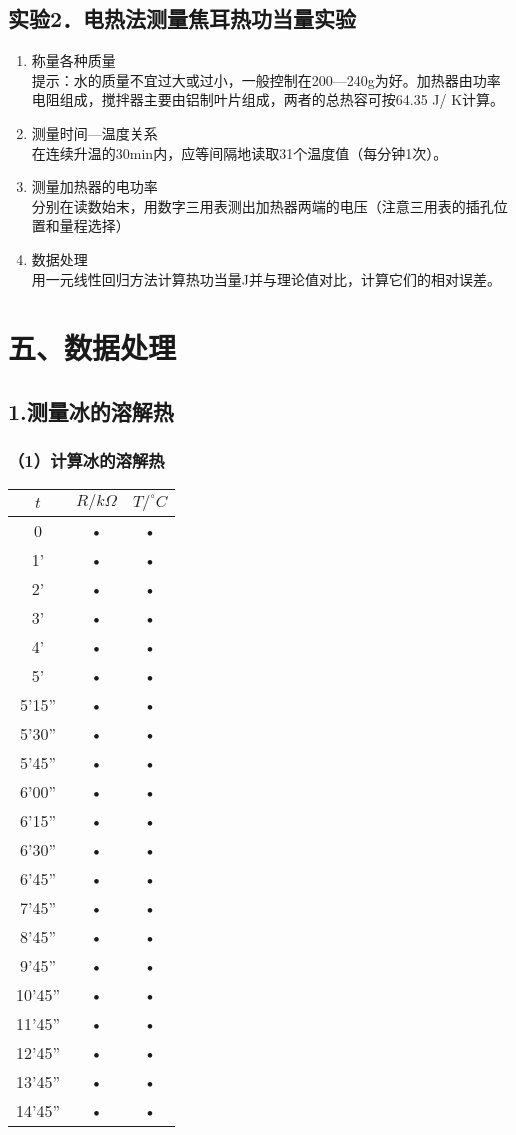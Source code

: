 \documentclass[11pt,a4paper,oneside]{article}
\begin{document}
\subsection*{实验2．电热法测量焦耳热功当量实验}
\begin{enumerate}
\item  称量各种质量\\
提示：水的质量不宜过大或过小，一般控制在200—240g为好。加热器由功率电阻组成，搅拌器主要由铝制叶片组成，两者的总热容可按64.35 J/ K计算。
\item  测量时间—温度关系\\
 在连续升温的30min内，应等间隔地读取31个温度值（每分钟1次）。
\item  测量加热器的电功率\\
分别在读数始末，用数字三用表测出加热器两端的电压（注意三用表的插孔位置和量程选择）
\item  数据处理\\
用一元线性回归方法计算热功当量J并与理论值对比，计算它们的相对误差。
\end{enumerate}

\section{五、数据处理}
\subsection{1.测量冰的溶解热}
\subsubsection{（1）计算冰的溶解热}
\begin{tabular}{|c|c|c|}
\hline 
$t$ & $R/k\Omega $ & $T/^{\circ}C$ \\ 
\hline 
0 & • & • \\ 
\hline 
1' & • & • \\ 
\hline 
2' & • & • \\ 
\hline 
3' & • & • \\ 
\hline 
4' & • & • \\ 
\hline 
5' & • & • \\ 
\hline 
5'15'' & • & • \\ 
\hline 
5'30'' & • & • \\ 
\hline 
5'45'' & • & • \\ 
\hline 
6'00'' & • & • \\ 
\hline 
6'15'' & • & • \\ 
\hline 
6'30'' & • & • \\ 
\hline 
6'45'' & • & • \\ 
\hline 
7'45'' & • & • \\ 
\hline 
8'45'' & • & • \\ 
\hline 
9'45'' & • & • \\ 
\hline 
10'45'' & • & • \\ 
\hline 
11'45'' & • & • \\ 
\hline 
12'45'' & • & • \\ 
\hline 
13'45'' & • & • \\ 
\hline 
14'45'' & • & • \\ 
\hline 
\end{tabular} 
\end{document}
